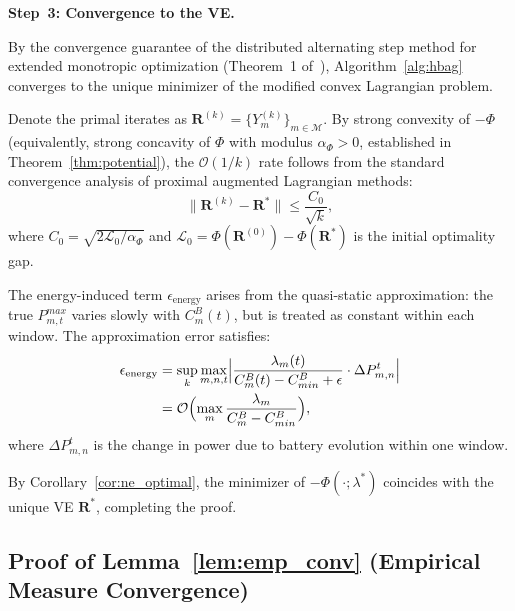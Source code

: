 \documentclass[journal]{IEEEtran}
\newcommand{\CB}{C^{B}}
\newcommand{\CBmin}{C^{B}_{min}}
\newcommand{\calM}{\mathcal{M}}
\newcommand{\bfR}{\mathbf{R}}
\begin{document}
\begin{IEEEproof}
\smallskip
\noindent\textbf{Step~3: Convergence to the VE.}

By the convergence guarantee of the distributed alternating step method for extended monotropic optimization (Theorem~1 of~\cite{cen2024satflow}), Algorithm~\ref{alg:hbag} converges to the unique minimizer of the modified convex Lagrangian problem.

Denote the primal iterates as $\bfR^{(k)} = \{Y_m^{(k)}\}_{m\in\calM}$. By strong convexity of $-\Phi$ (equivalently, strong concavity of $\Phi$ with modulus $\alpha_\Phi > 0$, established in Theorem~\ref{thm:potential}), the $\mathcal{O}(1/k)$ rate follows from the standard convergence analysis of proximal augmented Lagrangian methods:
\begin{equation}
    \|\bfR^{(k)} - \bfR^*\|
    \leq \frac{C_0}{\sqrt{k}},
\end{equation}
where $C_0 = \sqrt{2\mathcal{L}_0/\alpha_\Phi}$ and $\mathcal{L}_0 = \Phi(\bfR^{(0)}) - \Phi(\bfR^*)$ is the initial optimality gap.

The energy-induced term $\epsilon_{\mathrm{energy}}$ arises from the quasi-static approximation: the true $P_{m,t}^{max}$ varies slowly with $\CB_m(t)$, but is treated as constant within each window. The approximation error satisfies:
\begin{align}
    \epsilon_{\mathrm{energy}}
    &= \sup_k \max_{m,n,t}
    \Bigl|\frac{\lambda_m(t)}%
    {\CB_m(t)-\CBmin+\epsilon}
    \cdot \Delta P_{m,n}^t\Bigr|
    \notag\\
    &= \mathcal{O}\Bigl(\max_m
    \frac{\lambda_m}{\CB_m-\CBmin}\Bigr),
\end{align}
where $\Delta P_{m,n}^t$ is the change in power due to battery evolution within one window.

By Corollary~\ref{cor:ne_optimal}, the minimizer of $-\Phi(\cdot;\lambda^*)$ coincides with the unique VE $\bfR^*$, completing the proof.

\end{IEEEproof}

\subsection{Proof of Lemma~\ref{lem:emp_conv}
(Empirical Measure Convergence)}
\end{document}
